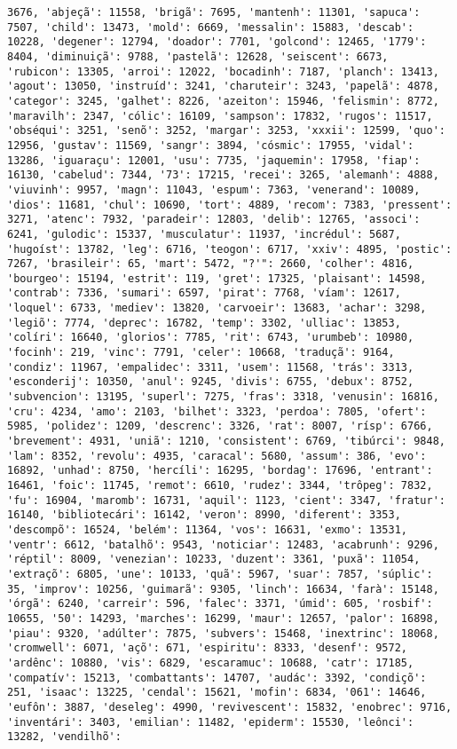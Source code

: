 \begin{Verbatim}[commandchars=\\\{\}]
3676, 'abjeçã': 11558, 'brigã': 7695, 'mantenh': 11301, 'sapuca': 7507, 'child': 13473, 'mold': 6669, 'messalin': 15883, 'descab': 10228, 'degener': 12794, 'doador': 7701, 'golcond': 12465, '1779': 8404, 'diminuiçã': 9788, 'pastelã': 12628, 'seiscent': 6673, 'rubicon': 13305, 'arroi': 12022, 'bocadinh': 7187, 'planch': 13413, 'agout': 13050, 'instruíd': 3241, 'charuteir': 3243, 'papelã': 4878, 'categor': 3245, 'galhet': 8226, 'azeiton': 15946, 'felismin': 8772, 'maravilh': 2347, 'cólic': 16109, 'sampson': 17832, 'rugos': 11517, 'obséqui': 3251, 'senõ': 3252, 'margar': 3253, 'xxxii': 12599, 'quo': 12956, 'gustav': 11569, 'sangr': 3894, 'cósmic': 17955, 'vidal': 13286, 'iguaraçu': 12001, 'usu': 7735, 'jaquemin': 17958, 'fiap': 16130, 'cabelud': 7344, '73': 17215, 'recei': 3265, 'alemanh': 4888, 'viuvinh': 9957, 'magn': 11043, 'espum': 7363, 'venerand': 10089, 'dios': 11681, 'chul': 10690, 'tort': 4889, 'recom': 7383, 'pressent': 3271, 'atenc': 7932, 'paradeir': 12803, 'delib': 12765, 'associ': 6241, 'gulodic': 15337, 'musculatur': 11937, 'incrédul': 5687, 'hugoíst': 13782, 'leg': 6716, 'teogon': 6717, 'xxiv': 4895, 'postic': 7267, 'brasileir': 65, 'mart': 5472, "?'": 2660, 'colher': 4816, 'bourgeo': 15194, 'estrit': 119, 'gret': 17325, 'plaisant': 14598, 'contrab': 7336, 'sumari': 6597, 'pirat': 7768, 'víam': 12617, 'loquel': 6733, 'mediev': 13820, 'carvoeir': 13683, 'achar': 3298, 'legiõ': 7774, 'deprec': 16782, 'temp': 3302, 'ulliac': 13853, 'colíri': 16640, 'glorios': 7785, 'rit': 6743, 'urumbeb': 10980, 'focinh': 219, 'vinc': 7791, 'celer': 10668, 'traduçã': 9164, 'condiz': 11967, 'empalidec': 3311, 'usem': 11568, 'trás': 3313, 'esconderij': 10350, 'anul': 9245, 'divis': 6755, 'debux': 8752, 'subvencion': 13195, 'superl': 7275, 'fras': 3318, 'venusin': 16816, 'cru': 4234, 'amo': 2103, 'bilhet': 3323, 'perdoa': 7805, 'ofert': 5985, 'polidez': 1209, 'descrenc': 3326, 'rat': 8007, 'rísp': 6766, 'brevement': 4931, 'uniã': 1210, 'consistent': 6769, 'tibúrci': 9848, 'lam': 8352, 'revolu': 4935, 'caracal': 5680, 'assum': 386, 'evo': 16892, 'unhad': 8750, 'hercíli': 16295, 'bordag': 17696, 'entrant': 16461, 'foic': 11745, 'remot': 6610, 'rudez': 3344, 'trôpeg': 7832, 'fu': 16904, 'maromb': 16731, 'aquil': 1123, 'cient': 3347, 'fratur': 16140, 'bibliotecári': 16142, 'veron': 8990, 'diferent': 3353, 'descompõ': 16524, 'belém': 11364, 'vos': 16631, 'exmo': 13531, 'ventr': 6612, 'batalhõ': 9543, 'noticiar': 12483, 'acabrunh': 9296, 'réptil': 8009, 'venezian': 10233, 'duzent': 3361, 'puxã': 11054, 'extraçõ': 6805, 'une': 10133, 'quã': 5967, 'suar': 7857, 'súplic': 35, 'improv': 10256, 'guimarã': 9305, 'linch': 16634, 'farà': 15148, 'órgã': 6240, 'carreir': 596, 'falec': 3371, 'úmid': 605, 'rosbif': 10655, '50': 14293, 'marches': 16299, 'maur': 12657, 'palor': 16898, 'piau': 9320, 'adúlter': 7875, 'subvers': 15468, 'inextrinc': 18068, 'cromwell': 6071, 'açõ': 671, 'espiritu': 8333, 'desenf': 9572, 'ardênc': 10880, 'vis': 6829, 'escaramuc': 10688, 'catr': 17185, 'compatív': 15213, 'combattants': 14707, 'audác': 3392, 'condiçõ': 251, 'isaac': 13225, 'cendal': 15621, 'mofin': 6834, '061': 14646, 'eufôn': 3887, 'deseleg': 4990, 'revivescent': 15832, 'enobrec': 9716, 'inventári': 3403, 'emilian': 11482, 'epiderm': 15530, 'leônci': 13282, 'vendilhõ': 
\end{Verbatim}
